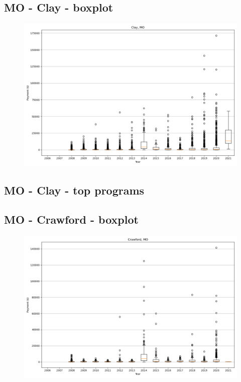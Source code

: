 \subsection*{MO - Clay - boxplot}
\begin{figure}[h]
\centering
\includegraphics[width=7in]{../output/boxplots/counties/Clay-MO_boxplot.png}
\end{figure}


\subsection*{MO - Clay - top programs}

\newpage
\subsection*{MO - Crawford - boxplot}
\begin{figure}[h]
\centering
\includegraphics[width=7in]{../output/boxplots/counties/Crawford-MO_boxplot.png}
\end{figure}


